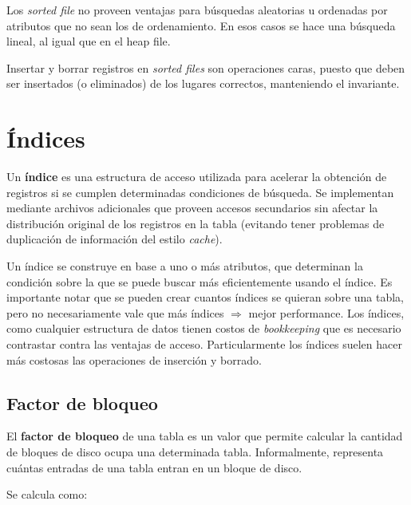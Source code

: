 \documentclass[]{article}
\begin{document}
Los \emph{sorted file} no proveen ventajas para búsquedas aleatorias u ordenadas por atributos que no sean los de ordenamiento. En esos casos se hace una búsqueda lineal, al igual que en el heap file.

Insertar y borrar registros en \emph{sorted files} son operaciones caras, puesto que deben ser insertados (o eliminados) de los lugares correctos, manteniendo el invariante.


\section{Índices}
Un \textbf{índice} es una estructura de acceso utilizada para acelerar la obtención de registros si se cumplen determinadas condiciones de búsqueda. Se implementan mediante archivos adicionales que proveen accesos secundarios sin afectar la distribución original de los registros en la tabla (evitando tener problemas de duplicación de información del estilo \emph{cache}).

Un índice se construye en base a uno o más atributos, que determinan la condición sobre la que se puede buscar más eficientemente usando el índice. Es importante notar que se pueden crear cuantos índices se quieran sobre una tabla, pero no necesariamente vale que más índices $\Rightarrow$ mejor performance. Los índices, como cualquier estructura de datos tienen costos de \emph{bookkeeping} que es necesario contrastar contra las ventajas de acceso. Particularmente los índices suelen hacer más costosas las operaciones de inserción y borrado.

\subsection{Factor de bloqueo}
El \textbf{factor de bloqueo} de una tabla es un valor que permite calcular la cantidad de bloques de disco ocupa una determinada tabla. Informalmente, representa cuántas entradas de una tabla entran en un bloque de disco.

Se calcula como:

\end{document}
